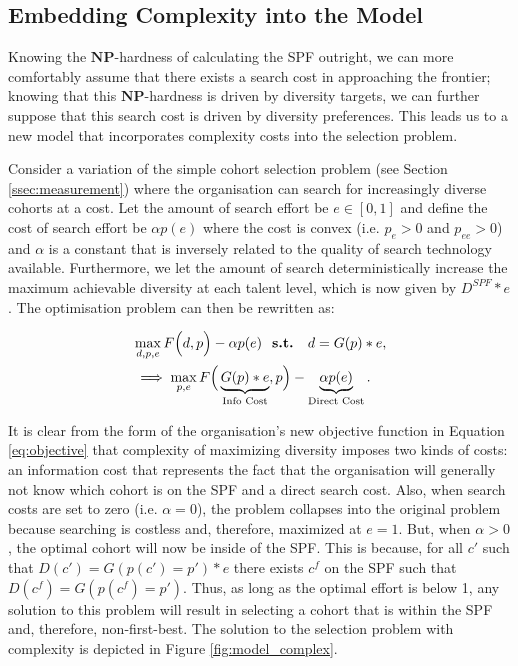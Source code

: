 \subsection{Embedding Complexity into the Model}\label{subsec:dts_w_complexity}
Knowing the $\mathbf{NP}$-hardness of calculating the SPF outright, we can more comfortably assume that there exists a search cost in approaching the frontier; knowing that this $\mathbf{NP}$-hardness is driven by diversity targets, we can further suppose that this search cost is driven by diversity preferences. This leads us to a new model that incorporates complexity costs into the selection problem.

Consider a variation of the simple cohort selection problem (see Section \ref{ssec:measurement}) where the organisation can search for increasingly diverse cohorts at a cost. Let the amount of search effort be $e\in[0,1]$ and define the cost of search effort be $\alpha p(e)$ where the cost is convex (i.e. $p_e>0$ and $p_{ee}>0$) and $\alpha$ is a constant that is inversely related to the quality of search technology available. Furthermore, we let the amount of search deterministically increase the maximum achievable diversity at each talent level, which is now given by $D^{SPF}*e$. The optimisation problem can then be rewritten as:

\begin{align}
&\max_{d,p,e} F\Big(d,p\Big) - \alpha p(e) \text{ \bf{ s.t. } } d = G(p)*e, \nonumber \\ 
& \implies \max_{p,e} F\Big(\underbrace{G(p)*e}_{\text{Info Cost}} ,p\Big) - \underbrace{\alpha p(e)}_{\text{Direct Cost}}. \label{eq:objective}
\end{align}

It is clear from the form of the organisation's new objective function in Equation \ref{eq:objective} that complexity of maximizing diversity imposes two kinds of costs: an information cost that represents the fact that the organisation will generally not know which cohort is on the SPF and a direct search cost. Also, when search costs are set to zero (i.e. $\alpha=0$), the problem collapses into the original problem because searching is costless and, therefore, maximized at $e=1$. But, when $\alpha>0$, the optimal cohort will now be inside of the SPF. This is because, for all $c'$ such that  $D(c')=G(p(c')=p')*e$ there exists $c^f$ on the SPF such that $D(c^f)=G(p(c^f)=p')$. Thus, as long as the optimal effort is below 1, any solution to this problem will result in selecting a cohort that is within the SPF and, therefore, non-first-best. The solution to the selection problem with complexity is depicted in Figure \ref{fig:model_complex}.


